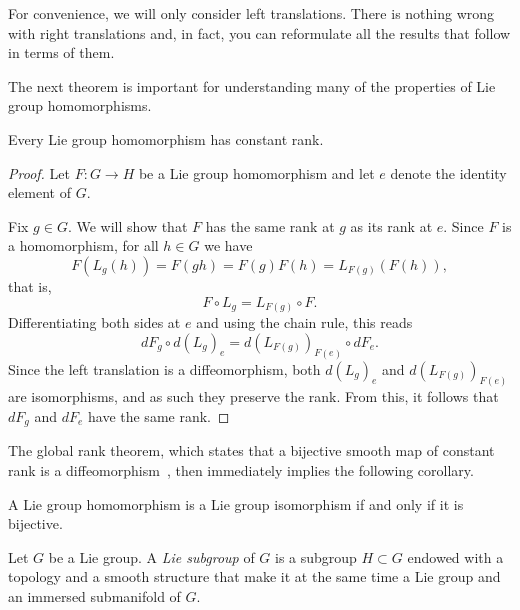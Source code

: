 \begin{remark}
	For convenience, we will only consider left translations.
	There is nothing wrong with right translations and, in fact, you can reformulate all the results that follow in terms of them.
\end{remark}

The next theorem is important for understanding many of the properties of Lie group homomorphisms.

\begin{theorem}
	Every Lie group homomorphism has constant rank.
\end{theorem}
\begin{proof}
	Let $F:G\to H$ be a Lie group homomorphism and let $e$ denote the identity element of $G$.

	Fix $g\in G$.
	We will show that $F$ has the same rank at $g$ as its rank at $e$.
	Since $F$ is a homomorphism, for all $h\in G$ we have
	\begin{equation}
		F(L_g(h)) = F(gh) = F(g)F(h) = L_{F(g)}(F(h)),
	\end{equation}
	that is,
	\begin{equation}
		F\circ L_g = L_{F(g)}\circ F.
	\end{equation}
	Differentiating both sides at $e$ and using the chain rule, this reads
	\begin{equation}
		dF_g\circ d(L_g)_e = d(L_{F(g)})_{F(e)}\circ dF_e.
	\end{equation}
	Since the left translation is a diffeomorphism, both $d(L_g)_e$ and $d(L_{F(g)})_{F(e)}$ are isomorphisms, and as such they preserve the rank.
	From this, it follows that $dF_g$ and $dF_e$ have the same rank.
\end{proof}

The global rank theorem, which states that a bijective smooth map of constant rank is a diffeomorphism~\cite[Theorem 4.14]{book:lee}, then immediately implies the following corollary.
\begin{corollary}
	A Lie group homomorphism is a Lie group isomorphism if and only if it is bijective.
\end{corollary}

\begin{definition}
	Let $G$ be a Lie group. A \emph{Lie subgroup} of $G$ is a subgroup $H\subset G$ endowed with a topology and a smooth structure that make it at the same time a Lie group and an immersed submanifold of $G$.
\end{definition}

